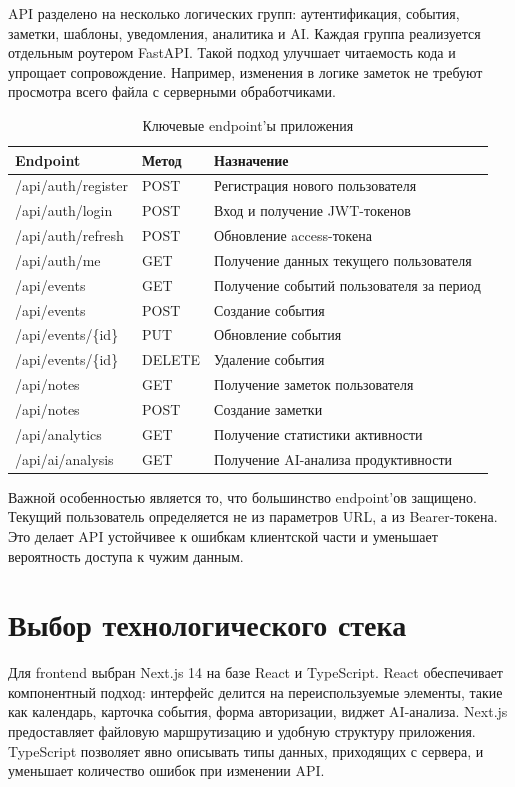 \documentclass[14pt,a4paper]{extreport}
\begin{document}
API разделено на несколько логических групп: аутентификация, события, заметки, шаблоны, уведомления, аналитика и AI. Каждая группа реализуется отдельным роутером FastAPI. Такой подход улучшает читаемость кода и упрощает сопровождение. Например, изменения в логике заметок не требуют просмотра всего файла с серверными обработчиками.

\begin{longtable}{|p{}|p{}|p{}|}
\caption{Ключевые endpoint'ы приложения}\\
\hline
\textbf{Endpoint} & \textbf{Метод} & \textbf{Назначение}\\
\hline
/api/auth/register & POST & Регистрация нового пользователя\\
\hline
/api/auth/login & POST & Вход и получение JWT-токенов\\
\hline
/api/auth/refresh & POST & Обновление access-токена\\
\hline
/api/auth/me & GET & Получение данных текущего пользователя\\
\hline
/api/events & GET & Получение событий пользователя за период\\
\hline
/api/events & POST & Создание события\\
\hline
/api/events/\{id\} & PUT & Обновление события\\
\hline
/api/events/\{id\} & DELETE & Удаление события\\
\hline
/api/notes & GET & Получение заметок пользователя\\
\hline
/api/notes & POST & Создание заметки\\
\hline
/api/analytics & GET & Получение статистики активности\\
\hline
/api/ai/analysis & GET & Получение AI-анализа продуктивности\\
\hline
\end{longtable}

Важной особенностью является то, что большинство endpoint'ов защищено. Текущий пользователь определяется не из параметров URL, а из Bearer-токена. Это делает API устойчивее к ошибкам клиентской части и уменьшает вероятность доступа к чужим данным.

\section{Выбор технологического стека}

Для frontend выбран Next.js 14 на базе React и TypeScript. React обеспечивает компонентный подход: интерфейс делится на переиспользуемые элементы, такие как календарь, карточка события, форма авторизации, виджет AI-анализа. Next.js предоставляет файловую маршрутизацию и удобную структуру приложения. TypeScript позволяет явно описывать типы данных, приходящих с сервера, и уменьшает количество ошибок при изменении API.
\end{document}
